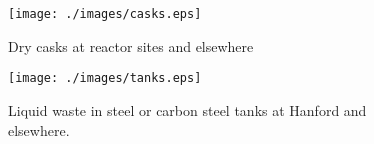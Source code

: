 

  \begin{figure}[htbp!]
    \begin{center}
    \begin{minipage}[t]{0.45\textwidth}
      \texttt{[image: ./images/casks.eps]}
      \caption{Dry casks at reactor sites and elsewhere \cite{nrc_dry_2008}}
        \label{fig:casks}
    \end{minipage}
    \hspace{0.01\textwidth}
    \begin{minipage}[t]{0.45\textwidth}
      \texttt{[image: ./images/tanks.eps]}
        \caption{Liquid waste in steel or carbon steel tanks at Hanford and 
          elsewhere\cite{doe_underground_????}.}
        \label{fig:tanks}
    \end{minipage}
    \end{center}
  \end{figure}
